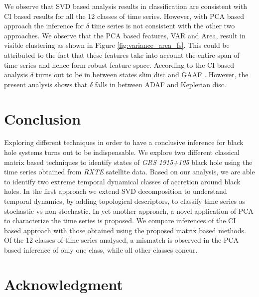 \documentclass[journal]{IEEEtran}
\begin{document}

We observe that SVD based analysis results in classification  are consistent with CI based results for all the 12 classes of time series. However, with PCA based approach the inference for  $\delta$ time series is not consistent with the other two approaches. We observe that the PCA based features, VAR and Area, result in visible clustering as shown in Figure \ref{fig:variance_area_fs}. This could be attributed to the fact that   these features take into account the entire span of time series and hence form robust feature space. According to the CI based analysis $\delta$ turns out to be in between states slim disc  and GAAF \cite{Adegoke2018}. However, the present analysis shows that $\delta$ falls in between ADAF and Keplerian disc.


\section{Conclusion}
Exploring different techniques in order to have a conclusive inference for black hole systems turns out to be indispensable. We explore two different classical matrix based techniques to identify states of \textit{GRS 1915+105} black hole using the time series obtained from \textit{RXTE} satellite data. Based on our analysis, we are able to identify two extreme temporal dynamical classes of accretion around black holes. In the first approach we extend  SVD decomposition to understand temporal dynamics,  by adding  topological descriptors, to classify time series as stochastic vs non-stochastic. In yet another approach, a novel application of  PCA  to characterize the time series is proposed. We compare inferences of the CI based approach with those obtained using the proposed matrix based methods. Of the 12 classes of time series analysed, a mismatch is observed in the PCA based inference of only one class, while all other classes concur.

\section*{Acknowledgment}
\end{document}
